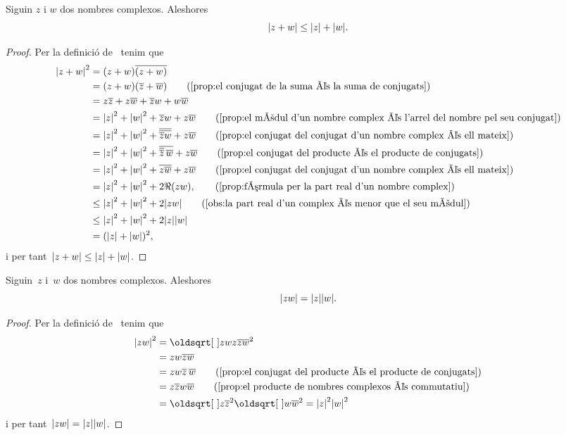 \documentclass[../Apunts.tex]{subfiles}
\begin{document}
	\begin{proposition}
		\label{prop:desigualta triangular nombres complexos}
		Siguin \(z\) i \(w\) dos nombres complexos. Aleshores
		\[\modul{z+w}\leq\modul{z}+\modul{w}.\]
		\begin{proof}
			Per la definició de~ tenim que
			\begin{align*}
				\modul{z+w}^{2}&=(z+w)\conjugat{(z+w)} \\
				&=(z+w)(\conjugat{z}+\conjugat{w}) \tag{\ref{prop:el conjugat de la suma és la suma de conjugats}} \\
				&=z\conjugat{z}+z\conjugat{w}+\conjugat{z}w+w\conjugat{w} \\
				&=\modul{z}^{2}+\modul{w}^{2}+\conjugat{z}w+z\conjugat{w} \tag{\ref{prop:el mòdul d'un nombre complex és l'arrel del nombre pel seu conjugat}} \\
				&=\modul{z}^{2}+\modul{w}^{2}+\conjugat{\conjugat{\conjugat{z}w}}+z\conjugat{w} \tag{\ref{prop:el conjugat del conjugat d'un nombre complex és ell mateix}} \\
				&=\modul{z}^{2}+\modul{w}^{2}+\conjugat{\conjugat{\conjugat{z}}\,\conjugat{w}}+z\conjugat{w} \tag{\ref{prop:el conjugat del producte és el producte de conjugats}} \\
				&=\modul{z}^{2}+\modul{w}^{2}+\conjugat{z\conjugat{w}}+z\conjugat{w}\tag{\ref{prop:el conjugat del conjugat d'un nombre complex és ell mateix}} \\
				&=\modul{z}^{2}+\modul{w}^{2}+2\Re(zw), \tag{\ref{prop:fórmula per la part real d'un nombre complex}} \\
				&\leq\modul{z}^{2}+\modul{w}^{2}+2\modul{zw} \tag{\ref{obs:la part real d'un complex és menor que el seu mòdul}} \\
				&\leq\modul{z}^{2}+\modul{w}^{2}+2\modul{z}\modul{w} \\
				&=(\modul{z}+\modul{w})^{2},
			\end{align*}
			i per tant~\(\modul{z+w}\leq\modul{z}+\modul{w}\).
		\end{proof}
	\end{proposition}
	\begin{proposition}
		\label{prop:el producte de mòduls és el mòdul del producte}
		Siguin~\(z\) i~\(w\) dos nombres complexos. Aleshores
		\[\modul{zw}=\modul{z}\modul{w}.\]
		\begin{proof}
			Per la definició de~ tenim que
			\begin{align*}
				\modul{zw}^{2}&=\sqrt{zwz\conjugat{zw}}^{2} \\
				&=zw\conjugat{zw} \\
				&=zw\conjugat{z}\,\conjugat{w} \tag{\ref{prop:el conjugat del producte és el producte de conjugats}} \\
				&=z\conjugat{z}w\conjugat{w} \tag{\ref{prop:el producte de nombres complexos és commutatiu}} \\
				&=\sqrt{z\conjugat{z}}^{2}\sqrt{w\conjugat{w}}^{2}=\modul{z}^{2}\modul{w}^{2}
			\end{align*}
			i per tant~\(\modul{zw}=\modul{z}\modul{w}\).
		\end{proof}
	\end{proposition}
\end{document}
